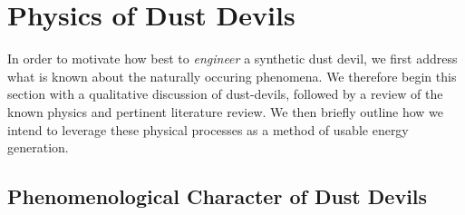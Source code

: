 \section{Physics of Dust Devils}
\label{sec:physics}


In order to motivate how best to \textit{engineer} a synthetic
dust devil, we first address what is known about the naturally occuring
phenomena. We therefore begin this section with a qualitative discussion
of dust-devils, followed by a review of the known physics and pertinent 
literature review. We then briefly outline how we intend to leverage
these physical processes as a method of usable energy generation. 


\subsection{Phenomenological Character of Dust Devils}


